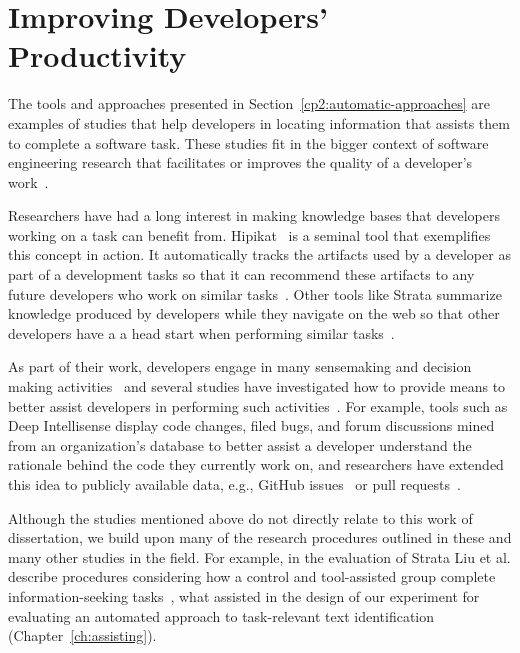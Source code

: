



\section{Improving Developers' Productivity}
\label{cp2:dev-productivity}



The tools and approaches presented in Section~\ref{cp2:automatic-approaches}
are examples of studies that help developers in locating 
information that assists them to complete a software task.
These studies fit in the bigger context 
of software engineering research 
that facilitates or improves the quality of a developer's work~\cite{Kersten2006, Meyer2017, satterfield2020}. 



Researchers have had a long interest in 
making knowledge bases
that developers working on a task can benefit from. 
Hipikat~\cite{Cubranic2005} is a seminal tool that exemplifies this concept in action.
It automatically tracks the artifacts 
used by a developer as part of a development tasks
so that it can recommend these artifacts to 
any future developers who work on similar tasks~\cite{Cubranic2005}.
Other tools like Strata summarize knowledge produced by developers 
while they navigate on the web so that other developers have a 
a head start when performing similar tasks~\cite{liu2021}.



As part of their work, developers engage in many sensemaking and decision making activities~\cite{sillito2006} and several studies have investigated how to 
provide means to better  
assist developers in performing such activities~\cite{Liu2018Unakite, liu2021, barnett2015}.
For example, tools such as Deep Intellisense 
display code changes, filed bugs, and forum discussions 
mined from an organization's database to better assist a developer
understand 
the rationale behind the code they currently work on,
and researchers have extended this idea to  
publicly available data, e.g., GitHub issues~\cite{Viviani2019}
or pull requests~\cite{freire2021}. 



Although the studies mentioned above do not directly relate 
to this work of dissertation, 
we build upon many of the research procedures outlined 
in these and many other studies in the field. 
For example, in the evaluation of Strata 
 Liu et al. describe procedures 
considering how a control and tool-assisted group 
complete information-seeking tasks~\cite{liu2021},
what assisted in the design of our experiment for 
evaluating an automated approach to
task-relevant text identification (Chapter~\ref{ch:assisting}).



